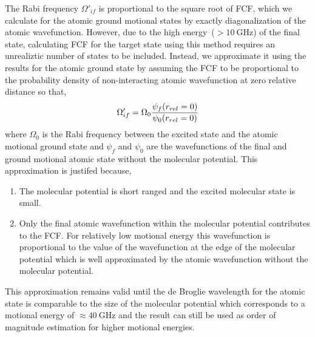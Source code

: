 The Rabi frequency $\Omega'_{if}$ is proportional to the square root of FCF,
which we calculate for the atomic ground motional states by exactly diagonalization
of the atomic wavefunction.
However, due to the high energy~($>\!10~\mathrm{GHz}$) of the final state,
calculating FCF for the target state using this method requires an unrealiztic number of
states to be included.
Instead, we approximate it using the results for the atomic ground state
by assuming the FCF to be proportional to the probability density of non-interacting
atomic wavefunction at zero relative distance so that,
\[
  \Omega'_{if}=\Omega_0\frac{\psi_f{\left({r_{rel}=0}\right)}}{\psi_0{\left({r_{rel}=0}\right)}}
\]
where $\Omega_0$ is the Rabi frequency between the excited state and
the atomic motional ground state and $\psi_f$ and $\psi_0$ are the
wavefunctions of the final and ground motional atomic state without the molecular potential.
This approximation is justifed because,
\begin{enumerate}
\item The molecular potential is short ranged and the excited molecular state is small.
\item Only the final atomic wavefunction within the molecular potential contributes to the FCF.
  For relatively low motional energy
  this wavefunction is proportional to the value of the wavefunction at
  the edge of the molecular potential which is well approximated by
  the atomic wavefunction without the molecular potential.
\end{enumerate}
This approximation remains valid until the de Broglie wavelength for the atomic state
is comparable to the size of the molecular potential which corresponds to
a motional energy of $\approx\!40~\mathrm{GHz}$
and the result can still be used as order of magnitude estimation for higher motional energies.

